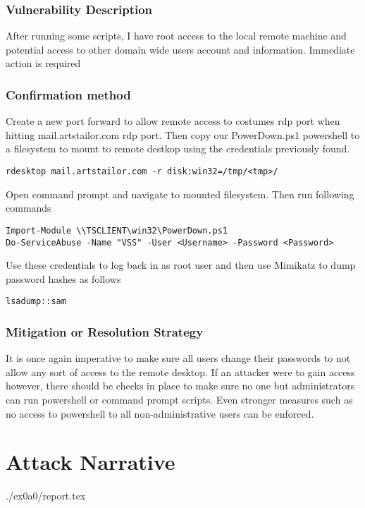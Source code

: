   	\subsubsection*{Vulnerability Description}
  		After running some scripts, I have root access to the local remote machine and potential
        access to other domain wide users account and information. Immediate action is required

  	\subsubsection*{Confirmation method}
  	Create a new port forward to allow remote access to costumes rdp port when hitting mail.artstailor.com
    rdp port. Then copy our PowerDown.ps1 powershell to a filesystem to mount to remote destkop using
    the credentials previously found.
    \begin{verbatim}
rdesktop mail.artstailor.com -r disk:win32=/tmp/<tmp>/
    \end{verbatim}
    Open command prompt and navigate to mounted filesystem. Then run following commands
    \begin{verbatim}
Import-Module \\TSCLIENT\win32\PowerDown.ps1
Do-ServiceAbuse -Name "VSS" -User <Username> -Password <Password>
    \end{verbatim}
    Use these credentials to log back in as root user and then use Mimikatz to dump password hashes as follows
    \begin{verbatim}
lsadump::sam
    \end{verbatim}

    \subsubsection*{Mitigation or Resolution Strategy}
    It is once again imperative to make sure all users change their passwords to not allow any sort 
    of access to the remote desktop. If an attacker were to gain access however, there should be checks
    in place to make sure no one but administrators can run powershell or command prompt scripts. Even
    stronger measures such as no access to powershell to all non-administrative users can be enforced.



\section{Attack Narrative}
./ex0a0/report.tex


